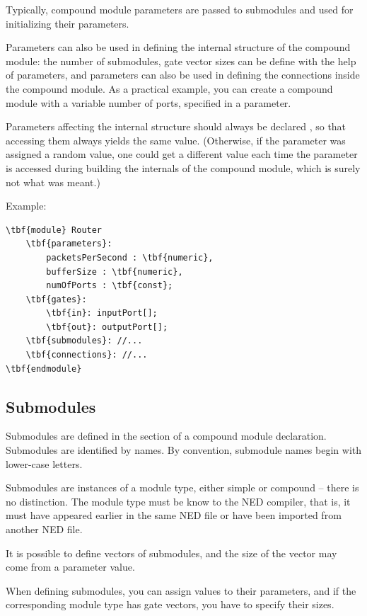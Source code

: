 Typically, compound module parameters are passed to submodules and
used for initializing their parameters.

Parameters can also be used in defining the internal structure of
the compound module: the number of submodules, gate vector sizes
can be define with the help of parameters, and parameters can
also be used in defining the connections inside the compound module.
As a practical example, you can create a  compound module
with a variable number of ports, specified in a  parameter.

Parameters affecting the internal structure should always be declared
, so that accessing them always yields the same value.
(Otherwise, if the parameter was assigned a random value, one could
get a different value each time the parameter is accessed during building
the internals of the compound module, which is surely not what was meant.)

Example:

\begin{Verbatim}[commandchars=\\\{\}]
\tbf{module} Router
    \tbf{parameters}:
        packetsPerSecond : \tbf{numeric},
        bufferSize : \tbf{numeric},
        numOfPorts : \tbf{const};
    \tbf{gates}:
        \tbf{in}: inputPort[];
        \tbf{out}: outputPort[];
    \tbf{submodules}: //...
    \tbf{connections}: //...
\tbf{endmodule}
\end{Verbatim}


\subsection{Submodules}

Submodules are defined in the
 section of a compound
module declaration. Submodules are identified by names.
By convention, submodule names begin with lower-case letters.

Submodules are instances of a module type, either simple
or compound -- there is no distinction. The module type
must be know to the NED compiler, that is, it must have appeared
earlier in the same NED file or have been imported from another
NED file.

It is possible to define vectors of submodules, and the
size of the vector may come from a parameter value.

When defining submodules, you can assign values to their
parameters, and if the corresponding module type has gate vectors,
you have to specify their sizes.


